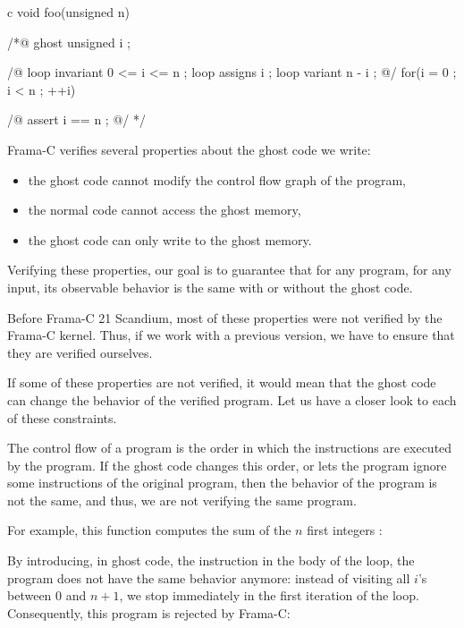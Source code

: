\begin{CodeBlock}{c}
void foo(unsigned n){
 /*@ ghost
   unsigned i ;

   /@
     loop invariant 0 <= i <= n ;
     loop assigns i ;
     loop variant n - i ;
   @/
   for(i = 0 ; i < n ; ++i){

   }
   /@ assert i == n ; @/
 */
}
\end{CodeBlock}




Frama-C verifies several properties about the ghost code we write:
\begin{itemize}
\item the ghost code cannot modify the control flow graph of the program,
\item the normal code cannot access the ghost memory,
\item the ghost code can only write to the ghost memory.
\end{itemize}

Verifying these properties, our goal is to guarantee that for any
program, for any input, its observable behavior is the same with or
without the ghost code.


\begin{Warning}
  Before Frama-C 21 Scandium, most of these properties were not
  verified by the Frama-C kernel. Thus, if we work with a previous
  version, we have to ensure that they are verified ourselves.
\end{Warning}


If some of these properties are not verified, it would mean that
the ghost code can change the behavior of the verified program.
Let us have a closer look to each of these constraints.




The control flow of a program is the order in which the instructions
are executed by the program. If the ghost code changes this order, or
lets the program ignore some instructions of the original program, then
the behavior of the program is not the same, and thus, we are not
verifying the same program.


For example, this function computes the sum of the $n$ first integers :




By introducing, in ghost code, the instruction  in
the body of the loop, the program does not have the same behavior
anymore: instead of visiting all $i$'s between $0$ and $n+1$, we stop
immediately in the first iteration of the loop. Consequently, this
program is rejected by Frama-C:


